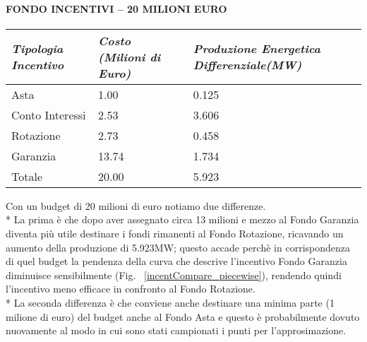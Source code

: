 \documentclass[12pt,a4paper,openright,twoside]{report}
\begin{document}
\paragraph{FONDO INCENTIVI – 20 MILIONI EURO}
\begin{center}
	\begin{tabular}{ | p{4.5cm}  | p{4.5cm} | p{4.5cm} | }
		\hline
		\nohyphens{\emph{Tipologia Incentivo}} & \nohyphens{\emph{Costo (Milioni di Euro)}} & \nohyphens{\emph{Produzione Energetica Differenziale(MW)}} \\ \hline
		Asta &  1.00 & 0.125 \\ \hline
		Conto Interessi & 2.53 & 3.606 \\ \hline
		Rotazione & 2.73 & 0.458 \\ \hline
		Garanzia & 13.74 & 1.734 \\ \hline \hline 
		Totale & 20.00 & 5.923 \\
		\hline
	\end{tabular}
\end{center}
Con un budget di 20 milioni di euro notiamo due differenze. \\* La prima è che dopo aver assegnato circa 13 milioni e mezzo al Fondo Garanzia diventa più utile destinare i fondi rimanenti al Fondo Rotazione, ricavando un aumento della produzione di 5.923MW; questo accade perchè in corrispondenza di quel budget la pendenza della curva che descrive l'incentivo Fondo Garanzia diminuisce sensibilmente (Fig. ~\ref{incentCompare_piecewise}), rendendo quindi l'incentivo meno efficace in confronto al Fondo Rotazione.\\* La seconda differenza è che conviene anche destinare una minima parte (1 milione di euro) del budget anche al Fondo Asta e questo è probabilmente dovuto nuovamente al modo in cui sono stati campionati i punti per l'approsimazione.
\end{document}
